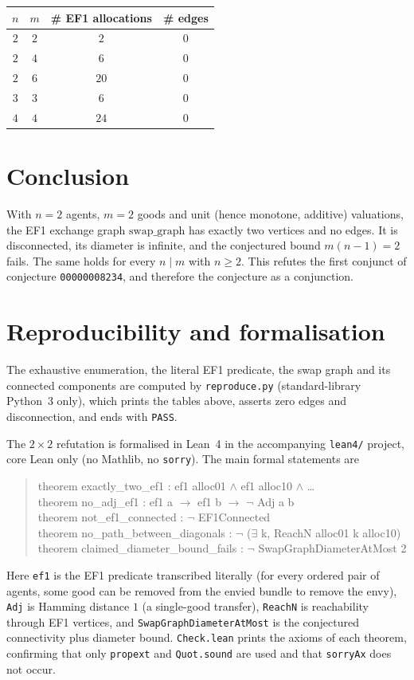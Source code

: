 \documentclass[11pt]{article}
\theoremstyle{definition}
\theoremstyle{remark}
\newcommand{\swapgraph}{\mathrm{swap\_graph}}
\begin{document}
\begin{center}
\begin{tabular}{c|c|c|c}
$n$ & $m$ & \# EF1 allocations & \# edges \\
\hline
$2$ & $2$ & $2$ & $0$ \\
$2$ & $4$ & $6$ & $0$ \\
$2$ & $6$ & $20$ & $0$ \\
$3$ & $3$ & $6$ & $0$ \\
$4$ & $4$ & $24$ & $0$ \\
\end{tabular}
\end{center}

\section{Conclusion}

With $n = 2$ agents, $m = 2$ goods and unit (hence monotone, additive)
valuations, the EF1 exchange graph $\swapgraph$ has exactly two vertices and no
edges. It is disconnected, its diameter is infinite, and the conjectured bound
$m(n-1) = 2$ fails. The same holds for every $n \mid m$ with $n \ge 2$. This
refutes the first conjunct of conjecture \texttt{00000008234}, and therefore the
conjecture as a conjunction.

\section{Reproducibility and formalisation}

The exhaustive enumeration, the literal EF1 predicate, the swap graph and its
connected components are computed by \texttt{reproduce.py} (standard-library
Python~3 only), which prints the tables above, asserts zero edges and
disconnection, and ends with \texttt{PASS}.

The $2 \times 2$ refutation is formalised in Lean~4 in the accompanying
\texttt{lean4/} project, core Lean only (no Mathlib, no \texttt{sorry}). The main
formal statements are

\begin{quote}\ttfamily
theorem exactly\_two\_ef1 : ef1 alloc01 \(\wedge\) ef1 alloc10 \(\wedge\) \dots\\
theorem no\_adj\_ef1 : ef1 a \(\to\) ef1 b \(\to\) \(\neg\) Adj a b\\
theorem not\_ef1\_connected : \(\neg\) EF1Connected\\
theorem no\_path\_between\_diagonals : \(\neg\) (\(\exists\) k, ReachN alloc01 k alloc10)\\
theorem claimed\_diameter\_bound\_fails : \(\neg\) SwapGraphDiameterAtMost 2
\end{quote}

\noindent Here \texttt{ef1} is the EF1 predicate transcribed literally (for
every ordered pair of agents, some good can be removed from the envied bundle to
remove the envy), \texttt{Adj} is Hamming distance $1$ (a single-good transfer),
\texttt{ReachN} is reachability through EF1 vertices, and
\texttt{SwapGraphDiameterAtMost} is the conjectured connectivity plus diameter
bound. \texttt{Check.lean} prints the axioms of each theorem, confirming that
only \texttt{propext} and \texttt{Quot.sound} are used and that \texttt{sorryAx}
does not occur.
\end{document}
